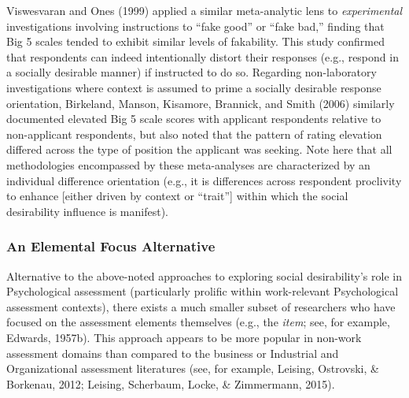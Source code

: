 \documentclass[
  english,
  ,jou]{apa6}
\begin{document}
Viswesvaran and Ones (1999) applied a similar meta-analytic lens to \emph{experimental} investigations involving instructions to ``fake good'' or ``fake bad,'' finding that Big 5 scales tended to exhibit similar levels of fakability. This study confirmed that respondents can indeed intentionally distort their responses (e.g., respond in a socially desirable manner) if instructed to do so. Regarding non-laboratory investigations where context is assumed to prime a socially desirable response orientation, Birkeland, Manson, Kisamore, Brannick, and Smith (2006) similarly documented elevated Big 5 scale scores with applicant respondents relative to non-applicant respondents, but also noted that the pattern of rating elevation differed across the type of position the applicant was seeking. Note here that all methodologies encompassed by these meta-analyses are characterized by an individual difference orientation (e.g., it is differences across respondent proclivity to enhance {[}either driven by context or ``trait''{]} within which the social desirability influence is manifest).

\hypertarget{an-elemental-focus-alternative}{%
\subsubsection{An Elemental Focus Alternative}\label{an-elemental-focus-alternative}}

Alternative to the above-noted approaches to exploring social desirability's role in Psychological assessment (particularly prolific within work-relevant Psychological assessment contexts), there exists a much smaller subset of researchers who have focused on the assessment elements themselves (e.g., the \emph{item}; see, for example, Edwards, 1957b). This approach appears to be more popular in non-work assessment domains than compared to the business or Industrial and Organizational assessment literatures (see, for example, Leising, Ostrovski, \& Borkenau, 2012; Leising, Scherbaum, Locke, \& Zimmermann, 2015).
\end{document}

